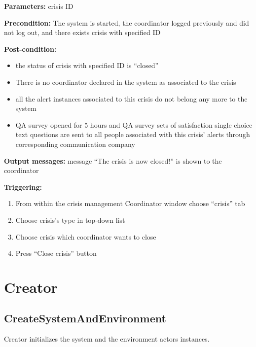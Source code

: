 \begin{description}

\item \textbf{Parameters:} crisis ID
\item \textbf{Precondition:} The system is started, the coordinator logged
previously and did not log out, and there exists crisis with specified ID
\item \textbf{Post-condition:} 
\begin{itemize}
  \item the status of crisis with specified ID is ``closed''
  \item There is no coordinator declared in the system as associated to the
  crisis
  \item all the alert instances associated to this crisis do not belong any more
  to the system
  \item QA survey opened for 5 hours and QA survey sets of satisfaction single
  choice text questions are sent to all people associated with this crisis'
  alerts through corresponding communication company
\end{itemize}
\item \textbf{Output messages:} message ``The crisis is now closed!'' is shown
to the coordinator

\item \textbf{Triggering:}
\begin{enumerate}
\item From within the crisis management Coordinator window choose ``crisis'' tab
\item Choose crisis's type in top-down list
\item Choose crisis which coordinator wants to close
\item Press ``Close crisis'' button
\end{enumerate}

\end{description}

\section{Creator}

\subsection{CreateSystemAndEnvironment}

Creator initializes the system and the environment actors instances.

